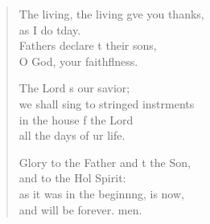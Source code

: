 \begin{verse}
\begin{patverse}
The living, the living g\pointup{\i}ve you thanks,\Med\\
as I do tday.\\
Fathers declare t their sons,\Med\\
O God, your faithflness.

The Lord \pointup{\i}s our savior;\Med\\
we shall sing to stringed instrments\\
in the house f the Lord\Med\\
all the days of ur life.

Glory to the Father and t the Son,\Med\\
and to the Hol Spirit:\\
as it was in the beginn\pointup{\i}ng, is now,\Med\\
and will be forever. men. 
  \end{patverse}
\end{verse}
